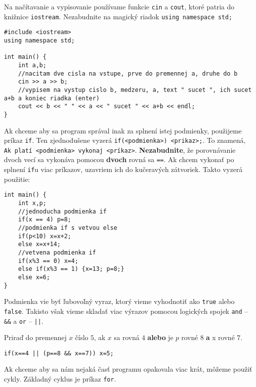 
Na načítavanie a vypisovanie používame funkcie \texttt{cin} a \texttt{cout}, ktoré patria do
knižnice \texttt{iostream}. Nezabudnite na magický riadok \texttt{using namespace std;}

\begin{lstlisting}
#include <iostream>
using namespace std;

int main() {
    int a,b;
    //nacitam dve cisla na vstupe, prve do premennej a, druhe do b
    cin >> a >> b;
    //vypisem na vystup cislo b, medzeru, a, text " sucet ", ich sucet a+b a koniec riadka (enter)
    cout << b << " " << a << " sucet " << a+b << endl;
}
\end{lstlisting}


Ak chceme aby sa program správal inak za splnení istej podmienky, použijeme príkaz \texttt{if}. Ten
zjednodušene vyzerá \texttt{if(<podmienka>) <prikaz>;}. To znamená, \texttt{Ak platí <podmienka>
vykonaj <príkaz>}. \textbf{Nezabudnite}, že porovnávanie dvoch vecí sa vykonáva pomocou \textbf{dvoch}
rovná sa \texttt{==}. Ak chcem vykonať po splnení \texttt{if}u viac príkazov, uzavriem ich do
kučeravých zátvoriek. Takto vyzerá použitie:

\begin{lstlisting}
int main() {
    int x,p;
    //jednoducha podmienka if
    if(x == 4) p=8;
    //podmienka if s vetvou else
    if(p<10) x=x+2;
    else x=x+14;
    //vetvena podmienka if
    if(x%3 == 0) x=4;
    else if(x%3 == 1) {x=13; p=8;}
    else x=6;
}
\end{lstlisting}

Podmienka vie byť ľubovoľný vyraz, ktorý vieme vyhodnotiť ako \texttt{true} alebo \texttt{false}.
Takisto však vieme skladať viac výrazov pomocou logických spojek \texttt{and} -- \texttt{\&\&} a
\texttt{or} -- \texttt{||}.

Priraď do premennej $x$ číslo $5$, ak $x$ sa rovná $4$ \textbf{alebo} je $p$ rovné $8$ \textbf{a} x
rovné $7$.
\begin{lstlisting}
if(x==4 || (p==8 && x==7)) x=5;
\end{lstlisting}

\newpage


Ak chceme aby sa nám nejaká časť programu opakovala viac krát, môžeme použiť cykly. Základný cyklus
je príkaz \texttt{for}.


